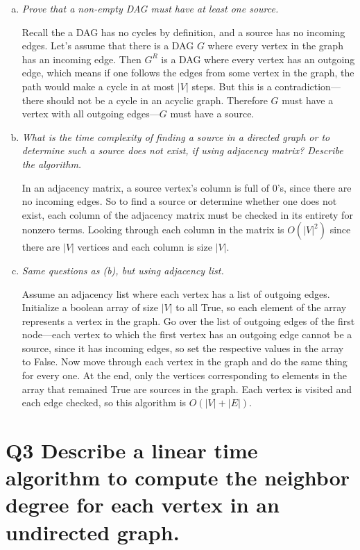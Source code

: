 \documentclass{article}
\begin{document}
\begin{enumerate}[(a)]
  \item \textit{Prove that a non-empty DAG must have at least one source.}
    
    Recall the a DAG has no cycles by definition, and a source has no incoming edges. Let's assume that there is a DAG $G$ where every vertex in the graph has an incoming edge. Then $G^R$ is a DAG where every vertex has an outgoing edge, which means if one follows the edges from some vertex in the graph, the path would make a cycle in at most $|V|$ steps. But this is a contradiction---there should not be a cycle in an acyclic graph. Therefore $G$ must have a vertex with all outgoing edges---$G$ must have a source.
  \item \textit{What is the time complexity of finding a source in a directed graph or to determine such a source does not exist, if using adjacency matrix? Describe the algorithm.}

    In an adjacency matrix, a source vertex's column is full of 0's, since there are no incoming edges. So to find a source or determine whether one does not exist, each column of the adjacency matrix must be checked in its entirety for nonzero terms. Looking through each column in the matrix is $O(|V|^2)$ since there are $|V|$ vertices and each column is size $|V|$.

  \item \textit{Same questions as (b), but using adjacency list.}

    Assume an adjacency list where each vertex has a list of outgoing edges. Initialize a boolean array of size $|V|$ to all True, so each element of the array represents a vertex in the graph. Go over the list of outgoing edges of the first node---each vertex to which the first vertex has an outgoing edge cannot be a source, since it has incoming edges, so set the respective values in the array to False. Now move through each vertex in the graph and do the same thing for every one. At the end, only the vertices corresponding to elements in the array that remained True are sources in the graph. Each vertex is visited and each edge checked, so this algorithm is $O(|V|+|E|)$.


\end{enumerate}


\section*{Q3 \normalsize Describe a linear time algorithm to compute the neighbor degree for each vertex in an undirected graph.}
\end{document}

